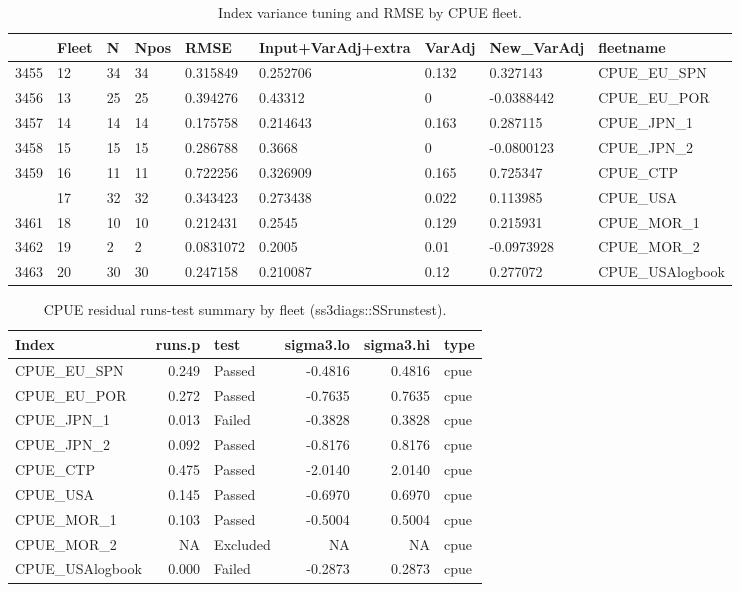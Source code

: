 \begin{table}

\caption{\label{tab:internal-index-tuning}Index variance tuning and RMSE by CPUE fleet.}
\centering
\begin{tabular}[t]{lllllllll}
\toprule
  & Fleet & N & Npos & RMSE & Input+VarAdj+extra & VarAdj & New\_VarAdj & fleetname\\
\midrule
3455 & 12 & 34 & 34 & 0.315849 & 0.252706 & 0.132 & 0.327143 & CPUE\_EU\_SPN\\
3456 & 13 & 25 & 25 & 0.394276 & 0.43312 & 0 & -0.0388442 & CPUE\_EU\_POR\\
3457 & 14 & 14 & 14 & 0.175758 & 0.214643 & 0.163 & 0.287115 & CPUE\_JPN\_1\\
3458 & 15 & 15 & 15 & 0.286788 & 0.3668 & 0 & -0.0800123 & CPUE\_JPN\_2\\
3459 & 16 & 11 & 11 & 0.722256 & 0.326909 & 0.165 & 0.725347 & CPUE\_CTP\\
\addlinespace
3460 & 17 & 32 & 32 & 0.343423 & 0.273438 & 0.022 & 0.113985 & CPUE\_USA\\
3461 & 18 & 10 & 10 & 0.212431 & 0.2545 & 0.129 & 0.215931 & CPUE\_MOR\_1\\
3462 & 19 & 2 & 2 & 0.0831072 & 0.2005 & 0.01 & -0.0973928 & CPUE\_MOR\_2\\
3463 & 20 & 30 & 30 & 0.247158 & 0.210087 & 0.12 & 0.277072 & CPUE\_USAlogbook\\
\bottomrule
\end{tabular}
\end{table}

\begin{table}

\caption{\label{tab:internal-runs-test}CPUE residual runs-test summary by fleet (ss3diags::SSrunstest).}
\centering
\begin{tabular}[t]{lrlrrl}
\toprule
Index & runs.p & test & sigma3.lo & sigma3.hi & type\\
\midrule
CPUE\_EU\_SPN & 0.249 & Passed & -0.4816 & 0.4816 & cpue\\
CPUE\_EU\_POR & 0.272 & Passed & -0.7635 & 0.7635 & cpue\\
CPUE\_JPN\_1 & 0.013 & Failed & -0.3828 & 0.3828 & cpue\\
CPUE\_JPN\_2 & 0.092 & Passed & -0.8176 & 0.8176 & cpue\\
CPUE\_CTP & 0.475 & Passed & -2.0140 & 2.0140 & cpue\\
\addlinespace
CPUE\_USA & 0.145 & Passed & -0.6970 & 0.6970 & cpue\\
CPUE\_MOR\_1 & 0.103 & Passed & -0.5004 & 0.5004 & cpue\\
CPUE\_MOR\_2 & NA & Excluded & NA & NA & cpue\\
CPUE\_USAlogbook & 0.000 & Failed & -0.2873 & 0.2873 & cpue\\
\bottomrule
\end{tabular}
\end{table}

